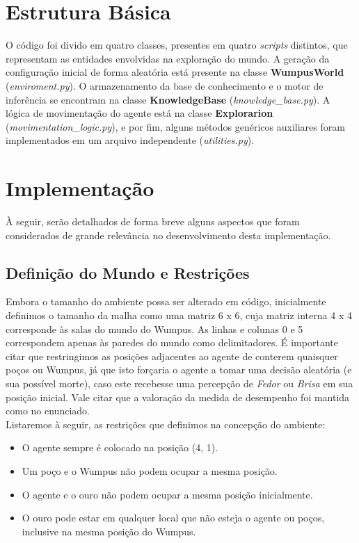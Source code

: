 \documentclass[a4paper, 12pt]{article}
\begin{document}
\section{Estrutura Básica}

O código foi divido em quatro classes, presentes em quatro \emph{scripts} distintos, que representam as entidades envolvidas na exploração do mundo. A geração da configuração inicial de forma aleatória está presente na classe \textbf{WumpusWorld} (\emph{enviroment.py}). O armazenamento da base de conhecimento e o motor de inferência se encontram na classe \textbf{KnowledgeBase} (\emph{knowledge{\_}base.py}). A lógica de movimentação do agente está na classe \textbf{Explorarion} (\emph{movimentation{\_}logic.py}), e por fim, alguns métodos genéricos auxiliares foram implementados em um arquivo independente (\emph{utilities.py}).
    
\section{Implementação}

À seguir, serão detalhados de forma breve alguns aspectos que foram considerados de grande relevância no desenvolvimento desta implementação.

\subsection{Definição do Mundo e Restrições}

Embora o tamanho do ambiente possa ser alterado em código, inicialmente definimos o tamanho da malha como uma matriz 6 x 6, cuja matriz interna 4 x 4 corresponde às salas do mundo do Wumpus. As linhas e colunas 0 e 5 correspondem apenas às paredes do mundo como delimitadores. É importante citar que restringimos as posições adjacentes ao agente de conterem quaisquer poços ou Wumpus, já que isto forçaria o agente a tomar uma decisão aleatória (e sua possível morte), caso este recebesse uma percepção de \emph{Fedor} ou \emph{Brisa} em sua posição inicial. Vale citar que a valoração da medida de desempenho foi mantida como no enunciado.\\

\noindent Listaremos à seguir, as restrições que definimos na concepção do ambiente:

\begin{itemize}
    \item O agente sempre é colocado na posição (4, 1).
    \item Um poço e o Wumpus não podem ocupar a mesma posição.
    \item O agente e o ouro não podem ocupar a mesma posição inicialmente.
    \item O ouro pode estar em qualquer local que não esteja o agente ou poços, inclusive na mesma posição do Wumpus.\\
\end{itemize}
\end{document}

